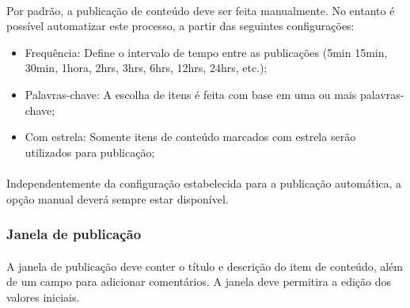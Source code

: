 \documentclass[a4paper,12pt]{article}
\begin{document}
\paragraph{}
Por padrão, a publicação de conteúdo deve ser feita manualmente. No entanto é
possível automatizar este processo, a partir das seguintes configurações:

\begin{itemize}


\item Frequência: Define o intervalo de tempo entre as publicações (5min 15min,
30min, 1hora, 2hrs, 3hrs, 6hrs, 12hrs, 24hrs, etc.);
\item Palavras-chave: A escolha de itens é feita com base em uma ou mais
palavras-chave;
\item Com estrela: Somente itens de conteúdo marcados com estrela serão
utilizados para publicação;
\end{itemize}

\paragraph{}
Independentemente da configuração estabelecida para a publicação automática, a
opção manual deverá sempre estar disponível.





\subsubsection{Janela de publicação}

\paragraph{}
A janela de publicação deve conter o título e descrição do item de conteúdo,
além de um campo para adicionar comentários. A janela deve permitira a edição
dos valores iniciais.
\end{document}
